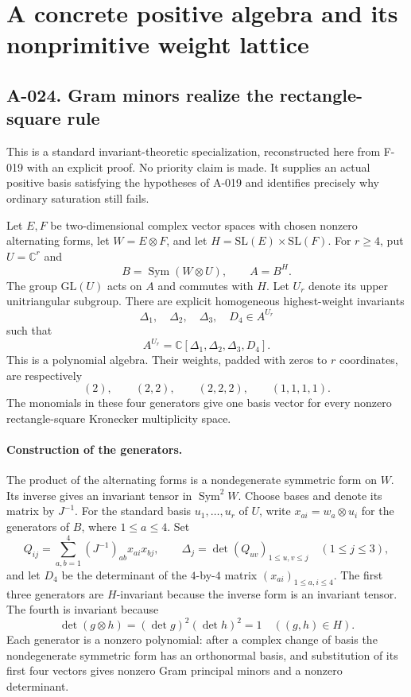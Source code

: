 \section{A concrete positive algebra and its nonprimitive weight lattice}

\subsection*{A-024. Gram minors realize the rectangle-square rule}
This is a standard invariant-theoretic specialization, reconstructed
here from F-019 with an explicit proof. No priority claim is made.
It supplies an actual positive basis satisfying the hypotheses of
A-019 and identifies precisely why ordinary saturation still fails.

Let $E,F$ be two-dimensional complex vector spaces with chosen
nonzero alternating forms, let $W=E\otimes F$, and let
$H=\mathrm{SL}(E)\times\mathrm{SL}(F)$. For $r\geq4$, put
$U=\mathbb C^r$ and
\[
 B=\operatorname{Sym}(W\otimes U),\qquad A=B^H.
\]
The group $\mathrm{GL}(U)$ acts on $A$ and commutes with $H$.
Let $U_r$ denote its upper unitriangular subgroup. There are
explicit homogeneous highest-weight invariants
\[
 \Delta_1,\quad\Delta_2,\quad\Delta_3,\quad D_4\in A^{U_r}
\]
such that
\[
 \boxed{\quad A^{U_r}=\mathbb C[\Delta_1,\Delta_2,\Delta_3,D_4].\quad}
                                                        \tag{A-024.1}
\]
This is a polynomial algebra. Their weights, padded with zeros
to $r$ coordinates, are respectively
\[
 (2),\qquad(2,2),\qquad(2,2,2),\qquad(1,1,1,1).          \tag{A-024.2}
\]
The monomials in these four generators give one basis vector
for every nonzero rectangle-square Kronecker multiplicity space.

\paragraph{Construction of the generators.}
The product of the alternating forms is a nondegenerate symmetric
form on $W$. Its inverse gives an invariant tensor in
$\operatorname{Sym}^2W$. Choose bases and denote its matrix
by $J^{-1}$. For the standard basis $u_1,\ldots,u_r$ of $U$,
write $x_{ai}=w_a\otimes u_i$ for the generators of $B$,
where $1\leq a\leq4$. Set
\[
 Q_{ij}=\sum_{a,b=1}^4(J^{-1})_{ab}x_{ai}x_{bj},\qquad
 \Delta_j=\det(Q_{uv})_{1\leq u,v\leq j}\quad(1\leq j\leq3),
\]
and let $D_4$ be the determinant of the $4$-by-$4$ matrix
$(x_{ai})_{1\leq a,i\leq4}$. The first three generators are
$H$-invariant because the inverse form is an invariant tensor.
The fourth is invariant because
\[
        \det(g\otimes h)=(\det g)^2(\det h)^2=1
                            \quad((g,h)\in H).
\]
Each generator is a nonzero polynomial: after a complex change
of basis the nondegenerate symmetric form has an orthonormal
basis, and substitution of its first four vectors gives
nonzero Gram principal minors and a nonzero determinant.

